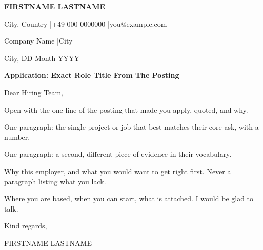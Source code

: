 \documentclass[a4paper,11pt]{article}
\begin{document}
{\large\bfseries\color{accent}FIRSTNAME LASTNAME}\par
\vspace{2pt}
{\footnotesize\color{medtext}City, Country \quad|\quad +49 000 0000000 \quad|\quad you@example.com}\par
\vspace{14pt}
{\footnotesize\color{medtext}Company Name \quad|\quad City}\par
\vspace{4pt}
{\footnotesize\color{medtext}City, DD Month YYYY}\par
\vspace{10pt}
\textbf{Application: Exact Role Title From The Posting}\par
\vspace{2pt}
Dear Hiring Team,\par
Open with the one line of the posting that made you apply, quoted, and why.

One paragraph: the single project or job that best matches their core ask, with a number.

One paragraph: a second, different piece of evidence in their vocabulary.

Why this employer, and what you would want to get right first. Never a paragraph listing what you lack.

Where you are based, when you can start, what is attached. I would be glad to talk.\par
\vspace{14pt}
Kind regards,\par
\vspace{2pt}
FIRSTNAME LASTNAME
\end{document}
